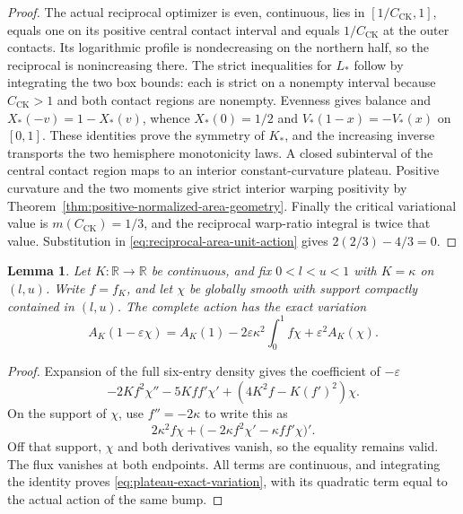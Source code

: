\documentclass[11pt]{article}
\newtheorem{lemma}[theorem]{Lemma}
\newcommand{\R}{\mathbb R}
\begin{document}
\begin{proof}
The actual reciprocal optimizer is even, continuous, lies in $[1/C_{\mathrm{CK}},1]$,
equals one on its positive central contact interval and equals $1/C_{\mathrm{CK}}$
at the outer contacts. Its logarithmic profile is nondecreasing on the northern
half, so the reciprocal is nonincreasing there. The strict inequalities for
$L_*$ follow by integrating the two box bounds: each is strict on a nonempty
interval because $C_{\mathrm{CK}}>1$ and both contact regions are nonempty.
Evenness gives balance and $X_*(-v)=1-X_*(v)$, whence $X_*(0)=1/2$ and
$V_*(1-x)=-V_*(x)$ on $[0,1]$.
These identities prove the symmetry of $K_*$, and the increasing inverse
transports the two hemisphere monotonicity laws. A closed subinterval of the
central contact region maps to an interior constant-curvature plateau.
Positive curvature and the two moments give strict interior warping positivity
by Theorem~\ref{thm:positive-normalized-area-geometry}.
Finally the critical variational value is $m(C_{\mathrm{CK}})=1/3$,
and the reciprocal warp-ratio integral is twice that value. Substitution in
\eqref{eq:reciprocal-area-unit-action} gives $2(2/3)-4/3=0$.
\end{proof}

\begin{lemma}\label{lem:plateau-first-variation}
Let $K:\R\to\R$ be continuous, and fix $0<l<u<1$ with $K=\kappa$ on $(l,u)$.
Write $f=f_K$, and let $\chi$ be globally smooth with support compactly
contained in $(l,u)$. The complete action has the exact variation
\begin{equation}\label{eq:plateau-exact-variation}
 A_K(1-\varepsilon\chi)=A_K(1)
 -2\varepsilon\kappa^2\int_0^1 f\chi
 +\varepsilon^2 A_K(\chi).
\end{equation}
\end{lemma}

\begin{proof}
Expansion of the full six-entry density gives the coefficient of $-\varepsilon$
\[
 -2Kf^2\chi''-5Kff'\chi'+(4K^2f-K(f')^2)\chi.
\]
On the support of $\chi$, use $f''=-2\kappa$ to write this as
\[
 2\kappa^2 f\chi+
 \bigl(-2\kappa f^2\chi'-\kappa ff'\chi\bigr)'.
\]
Off that support, $\chi$ and both derivatives vanish, so the equality remains
valid. The flux vanishes at both endpoints. All terms are continuous, and
integrating the identity proves \eqref{eq:plateau-exact-variation}, with its
quadratic term equal to the actual action of the same bump.
\end{proof}
\end{document}
